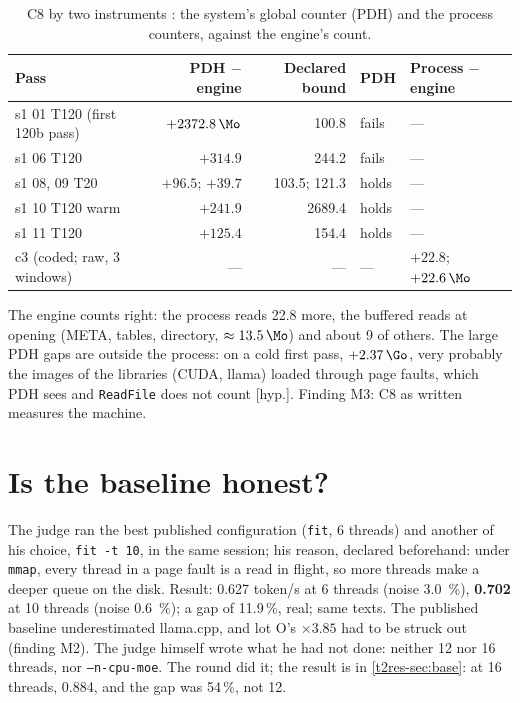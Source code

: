\begin{table}[ht]
\centering\small
\caption[C8 by two instruments]{C8 by two instruments \mes: the system's global counter (PDH) and the process counters, against the engine's count.}
\label{t2e-tab:c8}
\begin{tabular}{@{}lrrll@{}}
\toprule
Pass & PDH $-$ engine & Declared bound & PDH & Process $-$ engine \\
\midrule
s1 01 T120 (first 120b pass) & $+\SI{2372.8}{\Mo}$ & \num{100.8} & fails & --- \\
s1 06 T120 & $+\num{314.9}$ & \num{244.2} & fails & --- \\
s1 08, 09 T20 & $+\num{96.5}$; $+\num{39.7}$ & \num{103.5}; \num{121.3} & holds & --- \\
s1 10 T120 warm & $+\num{241.9}$ & \num{2689.4} & holds & --- \\
s1 11 T120 & $+\num{125.4}$ & \num{154.4} & holds & --- \\
c3 (coded; raw, 3 windows) & --- & --- & --- & $+\num{22.8}$; $+\SI{22.6}{\Mo}$ \\
\bottomrule
\end{tabular}
\end{table}

The engine counts right: the process reads \SI{22.8}{\Mo} more, the buffered reads at opening (META, tables, directory, $\approx \SI{13.5}{\Mo}$) and about \SI{9}{\Mo} of others. The large PDH gaps are outside the process: on a cold first pass, $+\SI{2.37}{\Go}$, very probably the images of the libraries (CUDA, llama) loaded through page faults, which PDH sees and \texttt{ReadFile} does not count [hyp.]. Finding M3: C8 as written measures the machine.

\section{Is the baseline honest?}\label{t2e-sec:base}

The judge ran the best published configuration (\texttt{fit}, 6 threads) and another of his choice, \texttt{fit -t 10}, in the same session; his reason, declared beforehand: under \texttt{mmap}, every thread in a page fault is a read in flight, so more threads make a deeper queue on the disk. Result: \num{0.627} token/s at 6 threads (noise \SI{3.0}{\percent}), \textbf{\num{0.702}} at 10 threads (noise \SI{0.6}{\percent}); a gap of \num{11.9}\,\%, real; same texts. The published baseline underestimated llama.cpp, and lot O's $\times 3.85$ had to be struck out (finding M2). The judge himself wrote what he had not done: neither 12 nor 16 threads, nor \texttt{--n-cpu-moe}. The round did it; the result is in \cref{t2res-sec:base}: at 16 threads, \num{0.884}, and the gap was \num{54}\,\%, not 12.

